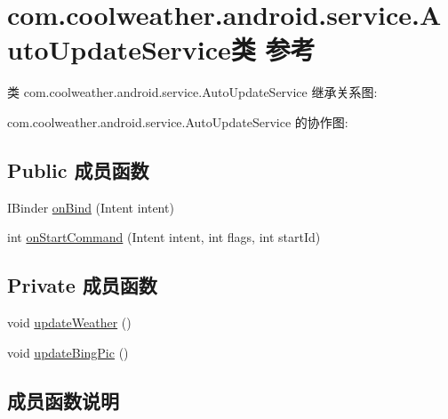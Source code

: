 \hypertarget{classcom_1_1coolweather_1_1android_1_1service_1_1_auto_update_service}{}\section{com.\+coolweather.\+android.\+service.\+Auto\+Update\+Service类 参考}
\label{classcom_1_1coolweather_1_1android_1_1service_1_1_auto_update_service}


类 com.\+coolweather.\+android.\+service.\+Auto\+Update\+Service 继承关系图\+:


com.\+coolweather.\+android.\+service.\+Auto\+Update\+Service 的协作图\+:
\subsection*{Public 成员函数}
\begin{DoxyCompactItemize}
\item 
I\+Binder \mbox{\hyperlink{classcom_1_1coolweather_1_1android_1_1service_1_1_auto_update_service_ab54a5561c4df58e98d066750576a9cd7}{on\+Bind}} (Intent intent)
\item 
int \mbox{\hyperlink{classcom_1_1coolweather_1_1android_1_1service_1_1_auto_update_service_ac166916a564c4c8ed1db054da07b213b}{on\+Start\+Command}} (Intent intent, int flags, int start\+Id)
\end{DoxyCompactItemize}
\subsection*{Private 成员函数}
\begin{DoxyCompactItemize}
\item 
void \mbox{\hyperlink{classcom_1_1coolweather_1_1android_1_1service_1_1_auto_update_service_abdd2c17ca5780c0b8e9c763c2e195eea}{update\+Weather}} ()
\item 
void \mbox{\hyperlink{classcom_1_1coolweather_1_1android_1_1service_1_1_auto_update_service_a216c23dfa1020d77a5d863161a76367c}{update\+Bing\+Pic}} ()
\end{DoxyCompactItemize}


\subsection{成员函数说明}
\mbox{\label{classcom_1_1coolweather_1_1android_1_1service_1_1_auto_update_service_ab54a5561c4df58e98d066750576a9cd7}} 
